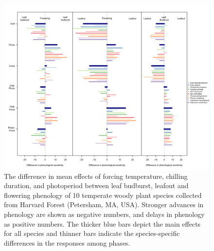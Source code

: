 \documentclass{article}\usepackage[]{graphicx}\usepackage[]{color}
\begin{document}
 \begin{figure}[!ht]
    \centering
 \includegraphics[width=\textwidth]{..//Plots/grover.png}
    \caption{The difference in mean effects of forcing temperature, chilling duration, and photoperiod between leaf budburst, leafout and flowering phenology of 10 temperate woody plant species collected from Harvard Forest (Petersham, MA, USA). Stronger advances in phenology are shown as negative numbers, and delays in phenology as positive numbers. The thicker blue bars depict the main effects for all species and thinner bars indicate the species-specific differences in the responses among phases.}
    \label{fig:altview}
\end{figure}
\end{document}

